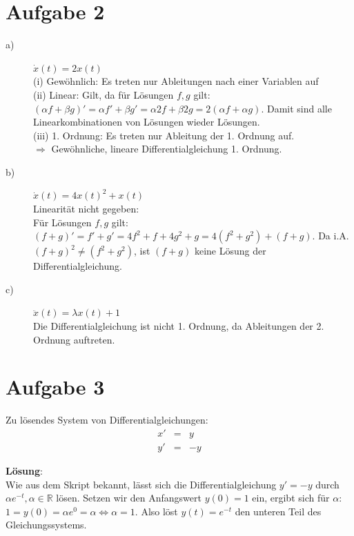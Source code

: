\documentclass[11pt,a4paper,ngerman]{article}
\begin{document}

\section*{Aufgabe 2}

\begin{description}
\item[a)] $\dot{x}(t) = 2x(t)$ \\
(i) Gewöhnlich: Es treten nur Ableitungen nach einer Variablen auf\\

(ii) Linear: Gilt, da für Lösungen $f,g$ gilt: $(\alpha f + \beta g)' = \alpha f' + \beta g' = \alpha 2f + \beta 2g = 2 (\alpha f + \alpha g)$. Damit sind alle Linearkombinationen von Lösungen wieder Lösungen. \\

(iii) 1. Ordnung:  Es treten nur Ableitung der 1. Ordnung auf. \\
$\Rightarrow$ Gewöhnliche, lineare Differentialgleichung 1. Ordnung.
\item[b)] $\dot{x}(t) = 4x(t)^2 + x(t)$ \\
Linearität nicht gegeben:  \\
Für Lösungen $f,g$ gilt: $(f + g)' = f' + g' = 4f^2 + f + 4g^2 + g = 4(f^2 + g^2) + (f+g)$. Da i.A. $(f+g)^2 \neq (f^2 + g^2)$, ist $(f+g)$ keine Lösung der Differentialgleichung.
\item[c)] $\ddot{x}(t) = \lambda x(t) +1$\\
Die Differentialgleichung ist nicht 1. Ordnung, da Ableitungen der 2. Ordnung auftreten.
\end{description}

\newpage

\section*{Aufgabe 3}
Zu lösendes System von Differentialgleichungen:
$$
\begin{array}{lcr}
x' &=& y \\
y' &=& -y
\end{array}
$$

\textbf{Lösung}:\\
Wie aus dem Skript bekannt, lässt sich die Differentialgleichung $y' = -y$ durch $\alpha e^{-t}, \alpha \in \mathbb{R}$ lösen. Setzen wir den Anfangswert $y(0) = 1$ ein, ergibt sich für $\alpha$: $1 = y(0) = \alpha e^{0} = \alpha \Leftrightarrow \alpha = 1$. Also löst $y(t) = e^{-t}$ den unteren Teil des Gleichungssystems.
\end{document}
